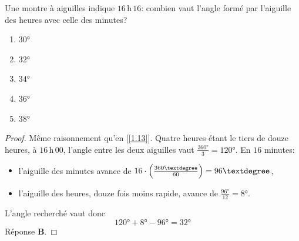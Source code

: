 % 
%
Une montre à aiguilles indique $16$\,h\,$16$: combien vaut l'angle formé par l'aiguille des heures avec celle des minutes?
%
\begin{enumerate}
  \item $30°$
  \item $32°$
  \item $34°$
  \item $36°$
  \item $38°$
\end{enumerate}
%
\begin{proof}
Même raisonnement qu'en [\ref{1.13}]. Quatre heures étant le tiers de douze heures, à $16$\,h\,$00$, l'angle entre les deux %
aiguilles vaut $\frac{360°}{3} = 120°$. En $16$ minutes:
%
\begin{itemize}[label=$\circ$]
  \item l'aiguille des minutes avance de $16\cdot\Bigl(\frac{360°}{60}\Bigr) = 96°$,
  \item l'aiguille des heures, douze fois moins rapide, avance de $\frac{96°}{12} = 8°$.

\end{itemize}
%
L'angle recherché vaut donc
%
\begin{equation}
  120° + 8° - 96° = 32°
\end{equation}
%
Réponse \textbf{B}.
\end{proof}